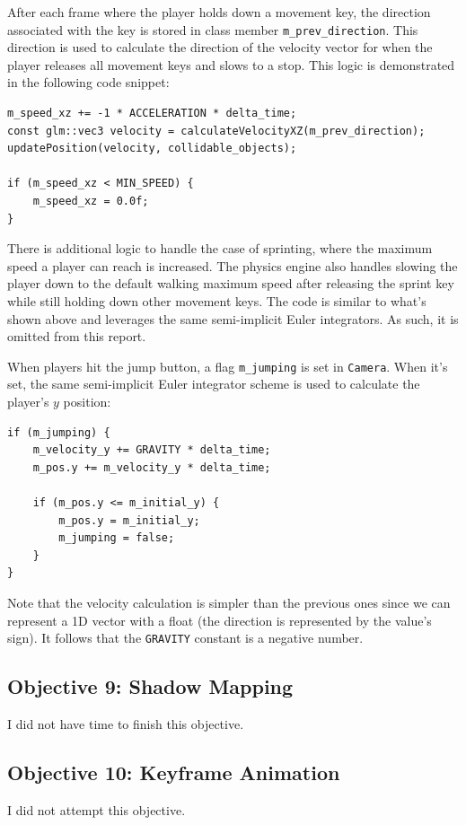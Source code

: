 \documentclass {article}
\begin{document}
After each frame where the player holds down a movement key, the direction associated with the key is stored in class member \texttt{m\_prev\_direction}. This direction is used to calculate the direction of the velocity vector for when the player releases all movement keys and slows to a stop. This logic is demonstrated in the following code snippet:
\begin{verbatim}
m_speed_xz += -1 * ACCELERATION * delta_time;
const glm::vec3 velocity = calculateVelocityXZ(m_prev_direction);
updatePosition(velocity, collidable_objects);

if (m_speed_xz < MIN_SPEED) {
    m_speed_xz = 0.0f;
}
\end{verbatim}

There is additional logic to handle the case of sprinting, where the maximum speed a player can reach is increased. The physics engine also handles slowing the player down to the default walking maximum speed after releasing the sprint key while still holding down other movement keys. The code is similar to what's shown above and leverages the same semi-implicit Euler integrators. As such, it is omitted from this report.

When players hit the jump button, a flag \texttt{m\_jumping} is set in \texttt{Camera}. When it's set, the same semi-implicit Euler integrator scheme is used to calculate the player's $y$ position:
\begin{verbatim}
if (m_jumping) {
    m_velocity_y += GRAVITY * delta_time;
    m_pos.y += m_velocity_y * delta_time;

    if (m_pos.y <= m_initial_y) {
        m_pos.y = m_initial_y;
        m_jumping = false;
    }
}
\end{verbatim}

Note that the velocity calculation is simpler than the previous ones since we can represent a 1D vector with a float (the direction is represented by the value's sign). It follows that the \texttt{GRAVITY} constant is a negative number.

\subsection{Objective 9: Shadow Mapping}
I did not have time to finish this objective.

\subsection{Objective 10: Keyframe Animation}
I did not attempt this objective.
\end{document}
